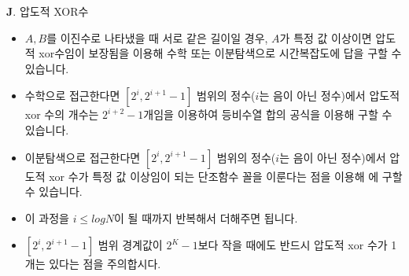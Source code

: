 \begin{frame}{\textbf{J}. 압도적 XOR수}
	\begin{itemize}
		\item $A, B$를 이진수로 나타냈을 때 서로 같은 길이일 경우, $A$가 특정 값 이상이면 압도적 xor수임이 보장됨을 이용해 수학 또는 이분탐색으로  시간복잡도에 답을 구할 수 있습니다.
		\item 수학으로 접근한다면 $[2^i, 2^{i+1}-1]$ 범위의 정수($i$는 음이 아닌 정수)에서 압도적 xor 수의 개수는 $2^{i+2}-1$개임을 이용하여 등비수열 합의 공식을 이용해 구할 수 있습니다.
		\item 이분탐색으로 접근한다면 $[2^i, 2^{i+1}-1]$ 범위의 정수($i$는 음이 아닌 정수)에서 압도적 xor 수가 특정 값 이상임이 되는 단조함수 꼴을 이룬다는 점을 이용해 에 구할 수 있습니다. 
		\item 이 과정을 $i \le logN$이 될 때까지 반복해서 더해주면 됩니다.
		\item $[2^i, 2^{i+1}-1]$ 범위 경계값이 $2^K - 1$보다 작을 때에도 반드시 압도적 xor 수가 1개는 있다는 점을 주의합시다.
	\end{itemize}
\end{frame}